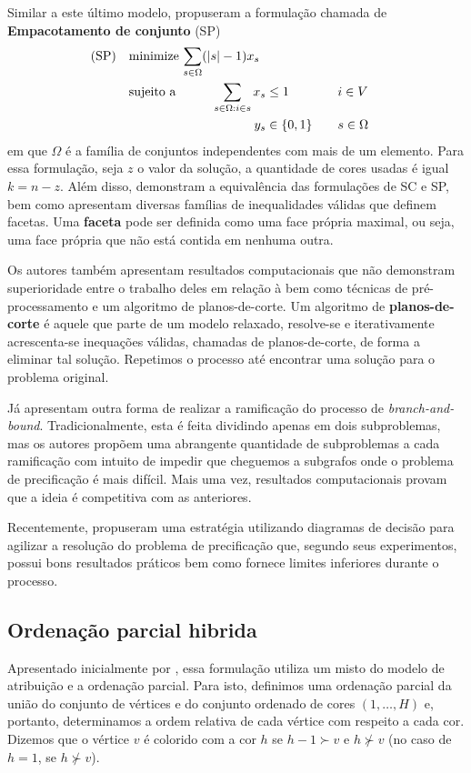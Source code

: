 \documentclass[11pt]{article}
\begin{document}
Similar a este último modelo, \textcite{Hansen2009Setcoveringpacking} propuseram a formulação chamada de \textbf{Empacotamento de conjunto} (SP)
\begin{alignat*}{4}
\mathrm{(SP)} \quad & \omit\rlap{minimize  $\displaystyle \sum_{s \in \Omega} (|s| - 1)x_s$} \\
& \mbox{sujeito a}&& \quad & \sum_{s \in \Omega: i \in s} x_{s}&\leq 1 & \quad & i \in V \\
&                 &&   & y_s       & \in \{0,1\} &    & s \in \Omega
\end{alignat*}
em que \(\Omega\) é a família de conjuntos independentes com mais de um elemento.
Para essa formulação, seja \(z\) o valor da solução, a quantidade de cores usadas é igual \(k = n - z\).
Além disso, \textcite{Hansen2009Setcoveringpacking} demonstram a equivalência das formulações de SC e SP, bem como apresentam diversas famílias de inequalidades válidas que definem facetas.
Uma \textbf{faceta} pode ser definida como uma face própria maximal, ou seja, uma face própria que não está contida em nenhuma outra.

Os autores também apresentam resultados computacionais que não demonstram superioridade entre o trabalho deles em relação à \textcite{Mehrotra1996ColumnGenerationApproach} bem como técnicas de pré-processamento e um algoritmo de planos-de-corte.
Um algoritmo de \textbf{planos-de-corte} é aquele que parte de um modelo relaxado, resolve-se e iterativamente acrescenta-se inequações válidas, chamadas de planos-de-corte, de forma a eliminar tal solução.
Repetimos o processo até encontrar uma solução para o problema original.

Já \textcite{Morrison2014WideBranchingStrategy} apresentam outra forma de realizar a ramificação do processo de \emph{branch-and-bound}.
Tradicionalmente, esta é feita dividindo apenas em dois subproblemas, mas os autores propõem uma abrangente quantidade de subproblemas a cada ramificação com intuito de impedir que cheguemos a subgrafos onde o problema de precificação é mais difícil.
Mais uma vez, resultados computacionais provam que a ideia é competitiva com as anteriores.

Recentemente, \textcite{Morrison2016SolvingPricingProblem} propuseram uma estratégia utilizando diagramas de decisão para agilizar a resolução do problema de precificação que, segundo seus experimentos, possui bons resultados práticos bem como fornece limites inferiores durante o processo.

\subsection{Ordenação parcial hibrida}
\label{sec:org686716b}
Apresentado inicialmente por \textcite{Jabrayilov2018NewIntegerLinear}, essa formulação utiliza um misto do modelo de atribuição e a ordenação parcial.
Para isto, definimos uma ordenação parcial da união do conjunto de vértices e do conjunto ordenado de cores \((1, \dots, H)\) e, portanto, determinamos a ordem relativa de cada vértice com respeito a cada cor.
Dizemos que o vértice \(v\) é colorido com a cor \(h\) se \(h-1 \succ v\) e \(h \nsucc v\) (no caso de \(h=1\), se \(h \nsucc v\)).
\end{document}
